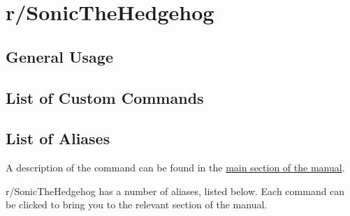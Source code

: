 \newcommand{\servername}[0]{r/SonicTheHedgehog }

\section{r/SonicTheHedgehog}

\subsection{General Usage}

\subsection{List of Custom Commands}

\subsection{List of Aliases}

A description of the  command can be found in the \hyperref[com:alias]{main section of the manual}.

\servername has a number of aliases, listed below. Each command can be clicked to bring you to the relevant section of the manual.

